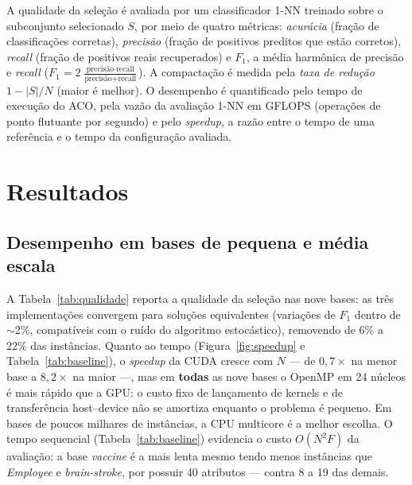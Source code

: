 \documentclass[12pt]{article}
\begin{document}
A qualidade da seleção é avaliada por um classificador 1-NN treinado sobre o subconjunto
selecionado $S$, por meio de quatro métricas: \textit{acurácia} (fração de classificações
corretas), \textit{precisão} (fração de positivos preditos que estão corretos), \textit{recall}
(fração de positivos reais recuperados) e $F_1$, a média harmônica de precisão e \textit{recall}
($F_1 = 2\,\frac{\text{precisão}\cdot\text{recall}}{\text{precisão}+\text{recall}}$). A
compactação é medida pela \textit{taxa de redução} $1 - |S|/N$ (maior é melhor). O desempenho é
quantificado pelo tempo de execução do ACO, pela vazão da avaliação 1-NN em GFLOPS (operações de
ponto flutuante por segundo) e pelo \textit{speedup}, a razão entre o tempo de uma referência e o
tempo da configuração avaliada.


\section{Resultados}

\subsection{Desempenho em bases de pequena e média escala}

A Tabela~\ref{tab:qualidade} reporta a qualidade da seleção nas nove bases: as três
implementações convergem para soluções equivalentes (variações de $F_1$ dentro de $\sim$2\%,
compatíveis com o ruído do algoritmo estocástico), removendo de 6\% a 22\% das instâncias.
Quanto ao tempo (Figura~\ref{fig:speedup} e Tabela~\ref{tab:baseline}), o \textit{speedup} da
CUDA cresce com $N$ --- de $0{,}7\times$ na menor base a $8{,}2\times$ na maior ---, mas em
\textbf{todas} as nove bases o OpenMP em 24 núcleos é mais rápido que a GPU: o custo fixo de
lançamento de kernels e de transferência host--device não se amortiza enquanto o problema é
pequeno. Em bases de poucos milhares de instâncias, a CPU multicore é a melhor escolha. O tempo
sequencial (Tabela~\ref{tab:baseline}) evidencia o custo $O(N^2 F)$ da avaliação: a base
\textit{vaccine} é a mais lenta mesmo tendo menos instâncias que \textit{Employee} e
\textit{brain-stroke}, por possuir 40 atributos --- contra 8 a 19 das demais.
\end{document}
